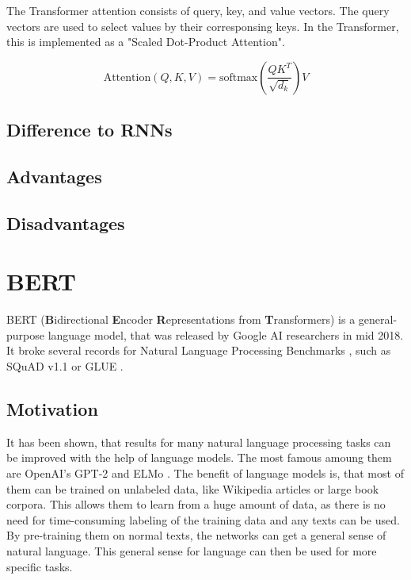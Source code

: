 The Transformer attention consists of query, key, and value vectors.
The query vectors are used to select values by their corresponsing keys.
In the Transformer, this is implemented as a "Scaled Dot-Product Attention".


\[
	\textrm{Attention}(Q,K,V) = \textrm{softmax}(\dfrac{QK^T}{\sqrt{d_k}})V
\]

 

\subsection{Difference to RNNs}


\subsection{Advantages}


\subsection{Disadvantages}



\section{BERT}

BERT (\textbf{B}idirectional \textbf{E}ncoder \textbf{R}epresentations from \textbf{T}ransformers) is a general-purpose language model, that was released by Google AI researchers in mid 2018.
It broke several records for Natural Language Processing Benchmarks \cite[p.~5--7]{devlin2018bert}, such as  SQuAD v1.1 \cite{rajpurkar-etal-2016-squad} or GLUE \cite{1804.07461}.

\subsection{Motivation}

It has been shown, that results for many natural language processing tasks can be improved with the help of language models.
The most famous amoung them are OpenAI's GPT-2 \cite{radford2019language} and ELMo \cite{1802.05365}.
The benefit of language models is, that most of them can be trained on unlabeled data, like Wikipedia articles or large book corpora.
This allows them to learn from a huge amount of data, as there is no need for time-consuming labeling of the training data and any texts can be used.
By pre-training them on normal texts, the networks can get a general sense of natural language.
This general sense for language can then be used for more specific tasks.

